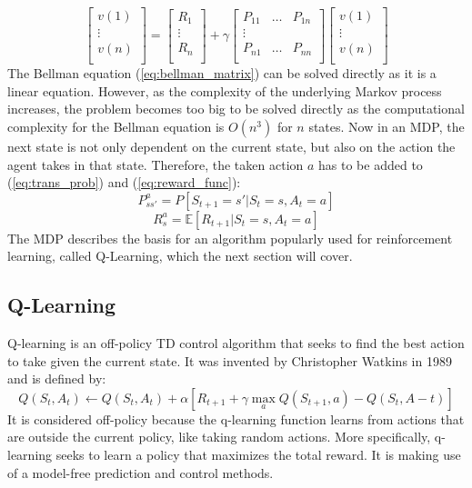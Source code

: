\documentclass[12pt,a4paper]{article}
\begin{document}
\begin{equation}
    \label{eq:bellman_matrix}
    \begin{bmatrix}
        v(1)\\
        \vdots\\
        v(n)\\
    \end{bmatrix} = \begin{bmatrix}
        R_1\\
        \vdots\\
        R_n\\
    \end{bmatrix} + \gamma \begin{bmatrix}
        P_{11} & \dots & P_{1n}\\
        \vdots\\
        P_{n1} & \dots & P_{nn}\\
    \end{bmatrix}  
    \begin{bmatrix}
        v(1)\\
        \vdots\\
        v(n)\\
    \end{bmatrix}
\end{equation}
The Bellman equation (\ref{eq:bellman_matrix}) can be solved directly as it is a linear equation. However, as the complexity of the underlying Markov process increases, the problem becomes too big to be solved directly as the computational complexity for the Bellman equation is $O(n^3)$ for $n$ states.
\newline
Now in an MDP, the next state is not only dependent on the current state, but also on the action the agent takes in that state. Therefore, the taken action $a$ has to be added to (\ref{eq:trans_prob}) and (\ref{eq:reward_func}):
\begin{equation}
    \label{eq:trans_prob_with_action}
    P_{ss'}^a = P[S_{t+1} = s' | S_t =s, A_t = a]
\end{equation}
\begin{equation}
    \label{eq:reward_func_with_action}
    R_s^a = \mathbb{E}[R_{t+1}|S_t = s, A_t = a]
\end{equation}
The MDP describes the basis for an algorithm popularly used for reinforcement learning, called Q-Learning, which the next section will cover.
\subsection{Q-Learning}
Q-learning is an off-policy TD control algorithm that seeks to find the best action to take given the current state. It was invented by Christopher Watkins in 1989 and is defined by:
\begin{equation}
    \label{eq:q_learn}
    Q(S_t, A_t) \leftarrow Q(S_t, A_t) + \alpha [R_{t+1}+\gamma \max_aQ(S_{t+1},a)-Q(S_t,A-t)]
\end{equation}
It is considered off-policy because the q-learning function learns from actions that are outside the current policy, like taking random actions. More specifically, q-learning seeks to learn a policy that maximizes the total reward. It is making use of a model-free prediction and control methods.
\end{document}
